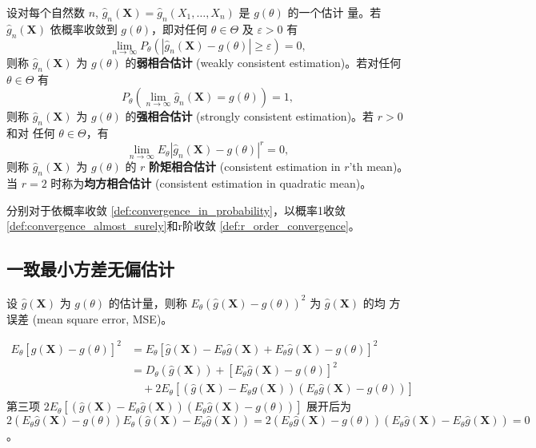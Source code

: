 \begin{definition}[相合估计]\label{def:consistent_estimation}
设对每个自然数 $n$, $\hat{g}_n(\mathbf{X}) = \hat{g}_n(X_1, \dots, X_n)$ 是 $g(\theta)$ 的一个估计
量。若 $\hat{g}_n(\mathbf{X})$ 依概率收敛到 $g(\theta)$，即对任何 $\theta \in \Theta$ 及 $\varepsilon > 0$ 有
\begin{equation}
\lim_{n\to\infty} P_\theta(|\hat{g}_n(\mathbf{X}) - g(\theta)| \geq \varepsilon) = 0, \label{eq:weakly_consistent}
\end{equation}
则称 $\hat{g}_n(\mathbf{X})$ 为 $g(\theta)$ 的\textbf{弱相合估计} (weakly consistent estimation)。若对任何 $\theta \in \Theta$ 有
\begin{equation}
P_\theta\left( \lim_{n\to\infty} \hat{g}_n(\mathbf{X}) = g(\theta) \right) = 1, \label{eq:strongly_consistent}
\end{equation}
则称 $\hat{g}_n(\mathbf{X})$ 为 $g(\theta)$ 的\textbf{强相合估计} (strongly consistent estimation)。若 $r > 0$ 和对
任何 $\theta \in \Theta$，有
\begin{equation}
\lim_{n\to\infty} E_\theta|\hat{g}_n(\mathbf{X}) - g(\theta)|^r = 0, \label{eq:r_consistent}
\end{equation}
则称 $\hat{g}_n(\mathbf{X})$ 为 $g(\theta)$ 的 $r$ \textbf{阶矩相合估计} (consistent estimation in $r$'th mean)。当
$r=2$ 时称为\textbf{均方相合估计} (consistent estimation in quadratic mean)。
\end{definition}
\begin{remark}
    分别对于依概率收敛 \ref{def:convergence_in_probability}，以概率1收敛 \ref{def:convergence_almost_surely}和r阶收敛 \ref{def:r_order_convergence}。
\end{remark}
\subsection{一致最小方差无偏估计}\label{subsec:一致最小方差无偏估计}
\begin{definition}[均方误差]\label{def:MSE}
设 $\hat{g}(\mathbf{X})$ 为 $g(\theta)$ 的估计量，则称 $E_\theta(\hat{g}(\mathbf{X}) - g(\theta))^2$ 为 $\hat{g}(\mathbf{X})$ 的均
方误差 (mean square error, MSE)。
\end{definition}
\begin{align*}
E_\theta[\hat{g}(\mathbf{X}) - g(\theta)]^2 &= E_\theta[\hat{g}(\mathbf{X}) - E_\theta \hat{g}(\mathbf{X}) + E_\theta \hat{g}(\mathbf{X}) - g(\theta)]^2 \\
&= D_\theta(\hat{g}(\mathbf{X})) + [E_\theta \hat{g}(\mathbf{X}) - g(\theta)]^2 \\
&\quad + 2E_\theta[(\hat{g}(\mathbf{X}) - E_\theta \hat{g}(\mathbf{X}))(E_\theta \hat{g}(\mathbf{X}) - g(\theta))]
\end{align*}
第三项 $2E_\theta[(\hat{g}(\mathbf{X}) - E_\theta \hat{g}(\mathbf{X}))(E_\theta \hat{g}(\mathbf{X}) - g(\theta))]$ 展开后为 $2(E_\theta \hat{g}(\mathbf{X}) - g(\theta)) E_\theta(\hat{g}(\mathbf{X}) - E_\theta \hat{g}(\mathbf{X})) = 2(E_\theta \hat{g}(\mathbf{X}) - g(\theta)) (E_\theta \hat{g}(\mathbf{X}) - E_\theta \hat{g}(\mathbf{X})) = 0$。

